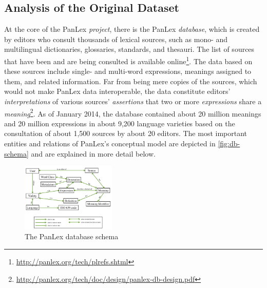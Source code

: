 \documentclass[sw]{iosart2c}
\begin{document}
\subsection{Analysis of the Original Dataset}
\label{sec:analysis}
At the core of the PanLex \emph{project}, there is the PanLex \emph{database}, which is created by editors who consult thousands of lexical sources, such as mono- and multilingual dictionaries, glossaries, standards, and thesauri.
The list of sources that have been and are being consulted is available online\footnote{\url{http://panlex.org/tech/plrefs.shtml}}.
The data based on these sources include single- and multi-word expressions, meanings assigned to them, and related information. Far from being mere copies of the sources, which would not make PanLex data interoperable, the data constitute editors' \emph{interpretations} of various sources' \emph{assertions} that two or more \emph{expressions} share a \emph{meaning}\footnote{\url{http://panlex.org/tech/doc/design/panlex-db-design.pdf}}.
As of January 2014, the database contained about 20 million meanings and 20 million expressions in about 9,200 language varieties based on the consultation of about 1,500 sources by about 20 editors.
The most important entities and relations of PanLex's conceptual model are depicted in \autoref{fig:db-schema} and are explained in more detail below.

\begin{figure}
  \centering
  \includegraphics[width=0.4\textwidth]{images/schema_new.png}
  \caption{The PanLex database schema}
  \label{fig:db-schema}
\end{figure}
\end{document}
